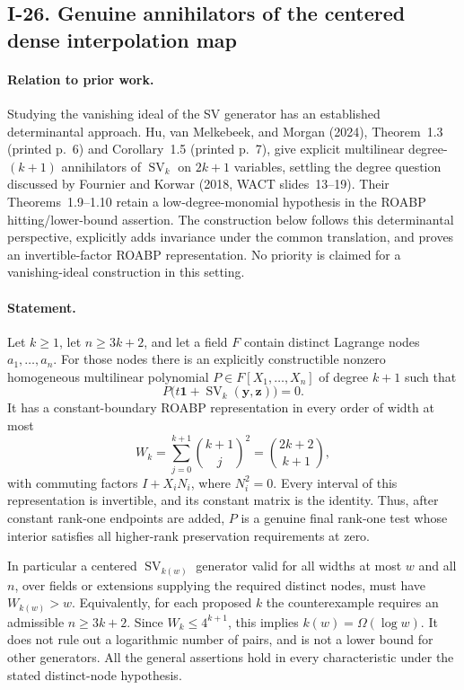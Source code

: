 \documentclass[11pt,a4paper]{article}
\theoremstyle{definition}\newtheorem{definition}{Definition}
\begin{document}
\subsection{I-26. Genuine annihilators of the centered dense interpolation map}
\label{I-26}

\paragraph{Relation to prior work.}
Studying the vanishing ideal of the SV generator has an established
determinantal approach.  Hu, van Melkebeek, and Morgan (2024),
Theorem~1.3 (printed p.~6) and Corollary~1.5 (printed p.~7), give explicit
multilinear degree-$(k+1)$ annihilators of $\operatorname{SV}_k$
on $2k+1$ variables, settling the degree question discussed by
Fournier and Korwar (2018, WACT slides~13--19).
Their Theorems~1.9--1.10 retain a low-degree-monomial hypothesis
in the ROABP hitting/lower-bound assertion.  The construction
below follows this determinantal perspective, explicitly adds
invariance under the common translation, and proves an
invertible-factor ROABP representation.  No priority is claimed
for a vanishing-ideal construction in this setting.

\paragraph{Statement.}
Let $k\ge1$, let $n\ge3k+2$, and let a field $F$ contain
distinct Lagrange nodes $a_1,\ldots,a_n$.  For those nodes there
is an explicitly constructible nonzero homogeneous multilinear
polynomial $P\in F[X_1,\ldots,X_n]$ of degree $k+1$ such that
\[
 P\bigl(t\mathbf1+\operatorname{SV}_k(\mathbf y,\mathbf z)\bigr)=0.
 \tag{I.32}\label{eq:I-centered-sv-zero}
\]
It has a constant-boundary ROABP representation in every order
of width at most
\[
 W_k=\sum_{j=0}^{k+1}\binom{k+1}{j}^{\!2}
       =\binom{2k+2}{k+1},
 \tag{I.33}\label{eq:I-centered-sv-width}
\]
with commuting factors $I+X_iN_i$, where $N_i^2=0$.
Every interval of this representation is invertible, and its
constant matrix is the identity.  Thus, after constant
rank-one endpoints are added, $P$ is a genuine final rank-one
test whose interior satisfies all higher-rank preservation
requirements at zero.

In particular a centered $\operatorname{SV}_{k(w)}$ generator
valid for all widths at most $w$ and all $n$, over fields or
extensions supplying the required distinct nodes, must have
$W_{k(w)}>w$.  Equivalently, for each proposed $k$ the
counterexample requires an admissible $n\ge3k+2$.
Since $W_k\le4^{k+1}$, this implies
$k(w)=\Omega(\log w)$.  It does not rule out a logarithmic
number of pairs, and is not a lower bound for other generators.
All the general assertions hold in every characteristic under
the stated distinct-node hypothesis.
\end{document}
